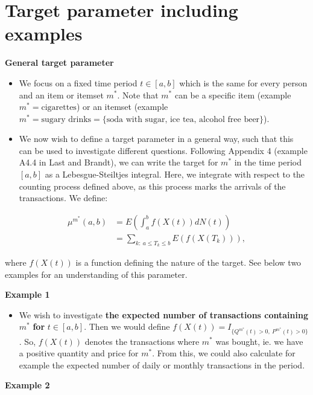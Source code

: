 \documentclass[
  11pt,
]{article}
\providecommand{\tightlist}{%
  \setlength{\itemsep}{0pt}\setlength{\parskip}{0pt}}
\begin{document}
\hypertarget{target-parameter-including-examples}{%
\section{Target parameter including
examples}\label{target-parameter-including-examples}}

\textbf{General target parameter}

\begin{itemize}
\tightlist
\item
  We focus on a fixed time period \(t \in [a,b]\) which is the same for
  every person and an item or itemset \(m^*\). Note that \(m^*\) can be
  a specific item (example \(m^*=\text{cigarettes}\)) or an itemset
  (example
  \(m^*=\text{sugary drinks} = \{\text{soda with sugar, ice tea, alcohol free beer}\}\)).
\item
  We now wish to define a target parameter in a general way, such that
  this can be used to investigate different questions. Following
  Appendix 4 (example A4.4 in Last and Brandt), we can write the target
  for \(m^*\) in the time period \([a,b]\) as a Lebesgue-Steiltjes
  integral. Here, we integrate with respect to the counting process
  defined above, as this process marks the arrivals of the transactions.
  We define:
\end{itemize}

\begin{align*}
\mu^{m^*}(a, b) &= E(\int_a^b f(X(t)) dN(t))\\ 
&= \sum_{k: \ a \leq T_k \leq b} E(f(X(T_k))),
\end{align*}

where \(f(X(t))\) is a function defining the nature of the target. See
below two examples for an understanding of this parameter.

\textbf{Example 1}

\begin{itemize}
\tightlist
\item
  We wish to investigate \textbf{the expected number of transactions
  containing} \(m^*\) \textbf{for} \(t\in[a,b]\). Then we would define
  \(f(X(t)) = I_{\{Q^{m^*}(t) > 0, \ P^{m^*}(t) > 0 \}}\). So,
  \(f(X(t))\) denotes the transactions where \(m^*\) was bought, ie. we
  have a positive quantity and price for \(m^*\). From this, we could
  also calculate for example the expected number of daily or monthly
  transactions in the period.
\end{itemize}

\textbf{Example 2}
\end{document}
